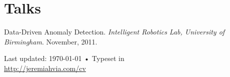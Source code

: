 \documentclass[10pt, a4paper]{article}
\begin{document}
\section*{Talks}
Data-Driven Anomaly Detection. \textit{Intelligent Robotics Lab, University
of Birmingham}. November, 2011.


\vfill{}
\begin{center}
  {\scriptsize  Last updated: \today\- •\-
    Typeset in \href{http://nitens.org/taraborelli/cvtex}{
      \XeTeX }\\
    \href{http://jeremiahvia.com/cv/cv.pdf}{http://jeremiahvia.com/cv}}
\end{center}
\end{document}
